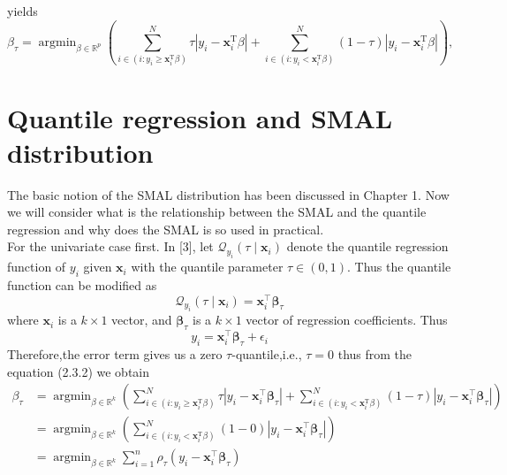 \documentclass[mstat,12pt]{unswthesis}  %
\numberwithin{equation}{section}
\begin{document}
yields
\begin{equation}
    \beta_\tau = \operatorname{argmin}_{\beta\in \mathbb{R}^p}\left(\sum_{i \in\left(i: y_{i} \geqslant \mathbf{x}_{i}^{\mathrm{T}} \beta\right)}^{N} \tau\left|y_{i}-\mathbf{x}_{i}^{\mathrm{T}} \beta\right|+\sum_{i \in\left(i: y_{i}<\mathbf{x}_{i}^{\mathrm{T}} \beta\right)}^{N}(1-\tau)\left|y_{i}-\mathbf{x}_{i}^{\mathrm{T}} \beta\right|\right),
\end{equation}

\section{Quantile regression and SMAL distribution}
The basic notion of the SMAL distribution has been discussed in Chapter 1. Now we will consider what is the relationship between the SMAL and the quantile regression and why does the SMAL is so used in practical. \\
For the univariate case first. In [3], let $\mathcal{Q}_{y_{i}}\left(\tau \mid \boldsymbol{x}_{i}\right)$ denote the quantile regression function of $y_i$ given $\boldsymbol{x}_{i}$ with the quantile parameter $\tau \in (0,1)$. Thus the quantile function can be modified as 
\begin{equation}
    \mathcal{Q}_{y_{i}}\left(\tau \mid \boldsymbol{x}_{i}\right)=\boldsymbol{x}_{i}^{\top} \boldsymbol{\beta}_{\tau}
\end{equation}
where $\boldsymbol{x}_{i}$ is a $k \times 1$ vector, and $\boldsymbol{\beta}_{\tau}$ is a $k \times 1$ vector of regression coefficients. Thus 
\begin{equation}
    y_{i}=\boldsymbol{x}_{i}^{\top} \boldsymbol{\beta}_{\tau}+\epsilon_{i}
\end{equation}
Therefore,the error term gives us a zero $\tau$-quantile,i.e., $\tau = 0$ thus from the equation (2.3.2) we obtain 
\begin{equation}
\begin{split}
    \beta_\tau & = \operatorname{argmin}_{\beta\in \mathbb{R}^k}\left(\sum_{i \in\left(i: y_{i} \geqslant \mathbf{x}_{i}^{\mathrm{T}} \beta\right)}^{N} \tau\left|y_{i}-\boldsymbol{x}_{i}^{\top} \boldsymbol{\beta}_{\tau}\right|+\sum_{i \in\left(i: y_{i}<\mathbf{x}_{i}^{\mathrm{T}} \beta\right)}^{N}(1-\tau)\left|y_{i}-\boldsymbol{x}_{i}^{\top} \boldsymbol{\beta}_{\tau}\right|\right)\\
    & = \operatorname{argmin}_{\beta\in \mathbb{R}^k}\left(\sum_{i \in\left(i: y_{i}<\mathbf{x}_{i}^{\mathrm{T}} \beta\right)}^{N}(1-0)\left|y_{i}-\boldsymbol{x}_{i}^{\top} \boldsymbol{\beta}_{\tau}\right|\right)\\
    & = \operatorname{argmin}_{\beta\in \mathbb{R}^k} \sum_{i=1}^{n} \rho_{\tau}\left(y_{i}-\boldsymbol{x}_{i}^{\top} \boldsymbol{\beta}_{\tau}\right)
\end{split}
\end{equation}
\end{document}

